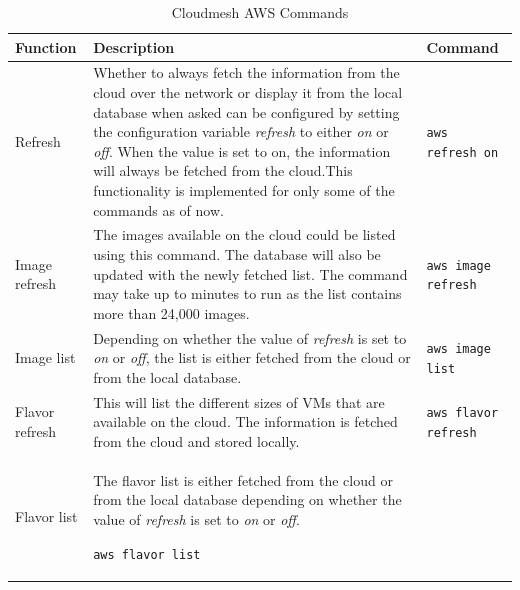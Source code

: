 \documentclass[9pt,twocolumn,twoside]{../../styles/osajnl}
\begin{document}
\begin{table}[htb]
\caption{Cloudmesh AWS Commands}\label{T:aws-commands} 
\begin{center}
\begin{tabular}{p{2cm}p{10cm}p{5cm}}
  Function & Description & Command \\
  \hline
  Refresh &
            Whether to always fetch the information from the cloud
            over the network or display it from the local database when asked
            can be configured by setting the configuration variable {\it refresh} to
            either {\it on} or {\it off}. When the value is set to on, the information
            will always be fetched from the cloud.This functionality is
            implemented for only some of the commands as of now.
                         & \verb+aws refresh on+ \\
  \hline
  Image refresh&
                 The images available on the cloud could be listed
                 using this command. The database will also be updated with the newly
                 fetched list. The command may take up to minutes to run as the list
                 contains more than 24,000 images. 
    & \verb+aws image refresh+ \\
\hline
Image list & Depending on whether the value of {\it refresh} is
      set to {\it on} or {\it off}, the list is either fetched from the
      cloud or from the local database. &
    \verb+aws image list+\\
\hline	
Flavor refresh & This will list the different sizes of VMs
                   that are available on the cloud. The information is fetched from
                   the cloud and stored locally. & 
                                                   \verb+aws flavor refresh+ \\ 
\hline
Flavor list & The flavor list is either fetched from the
      cloud or from the local database depending on whether the
      value of {\it refresh} is set to {\it on} or {\it off}.
	
    \verb+aws flavor list+ \\
	

\end{tabular}
\end{center}
\end{table}
\end{document}
